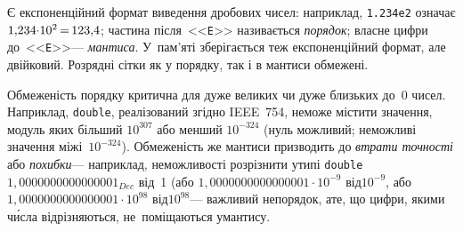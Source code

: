 \documentclass[14pt,a4paper]{extarticle}
\def\dib#1{\,#1\discretionary{}{\mbox{$#1$}}{}\,}
\begin{document}



\label{sec:floating-point}
Є експоненційний формат виведення дробових чисел: наприклад, \texttt{1.234e2} означає ${1{,}234{\cdot}10^2}\dib{{=}}123{,}4$; частина після~<<\texttt{E}>> називається \emph{порядок}; власне цифри до~<<\texttt{E}>>\nolinebreak[3] --- \emph{мантиса}. У~пам'яті зберігається теж експоненційний формат, але двійковий. Розрядні сітки як у порядку, так і в мантиси обмежені.

Обмеженість порядку критична для дуже великих чи дуже близьких до~0 чисел. Наприклад,  \texttt{double}, реалізований згідно IEEE~754, не\nolinebreak[3] може містити значення, модуль яких більший $10^{307}$ або менший $10^{-324}$ (нуль можливий; немож\-ливі значення між\nolinebreak[1] і~$10^{-324}$).
Обмеженість же мантиси призводить до \emph{втрати точності} або \emph{похибки}\nolinebreak[3] --- наприклад, неможливості розрізнити у\nolinebreak[2] типі \texttt{double} $1{,}0000000000000001_{Dec}$ від~1 (або $1{,}0000000000000001{\cdot}10^{-9}$ від\nolinebreak[2] $10^{-9}$, або $1{,}0000000000000001{\cdot}10^{98}$ від\nolinebreak[2] $10^{98}$\nolinebreak[3] --- важливий не\nolinebreak[3] порядок, 
а\nolinebreak[3] те, що цифри, якими ч\'{и}сла відрізняються, не~поміщаються у\nolinebreak[3] мантису.
\end{document}
